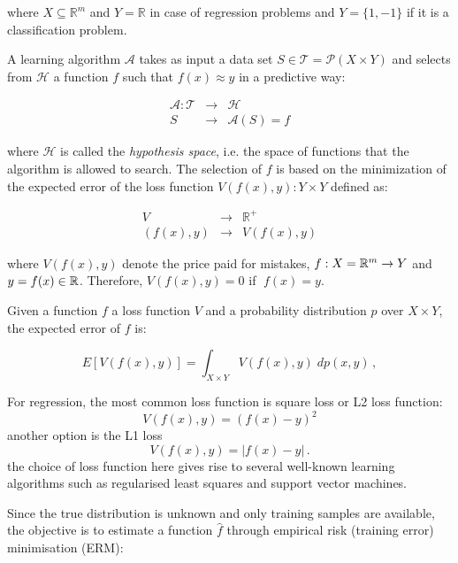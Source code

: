 \noindent where $X \subseteq \mathbb{R}^m$ and $Y = \mathbb{R}$ in case of
regression problems and $Y = \{1,-1\}$  if it is a classification problem. 


A learning algorithm $\mathcal{A}$ takes as input a data set $S \in
\mathscr{T}=\mathscr{P}(X\times Y)$ and selects from $\mathcal{H}$ a function
$f$ such that $f(x)\approx y $ in a predictive way:

\begin{eqnarray*}
\mathcal{A}: \mathscr{T} &\rightarrow & \mathcal{H} \\
S &\rightarrow &\mathcal{A}(S) = f
\end{eqnarray*}

\noindent where $\mathcal{H}$ is called the {\em hypothesis space}, i.e. the space
of functions that the algorithm is allowed to search. The selection of
$f$ is based on the minimization of the expected error of the loss
function $V(f(x),y): Y \times Y$ defined as:

\begin{eqnarray*}
 V & \rightarrow & \mathbb{R}^+ \\
  (f(x), y) &\rightarrow & V(f(x),y)
\end{eqnarray*}

\noindent where $V(f(x),y)$ denote the price paid for mistakes, $f:X={\mathbb R }^m\to Y$ and
$y=f(x)\in{\mathbb R }$. Therefore, $V(f(x),y)=0$ if $\;f(x)=y$.

Given a function $f$ a loss function $V$ and a probability distribution $p$ over $X \times Y$, the expected error of $f$ is:

\begin{equation}
\label{eq:expetedrisk}
E[V(f(x),y)] = \int_{X\times Y} V(f(x),y)\;dp(x,y)\,,
\end{equation}


For regression, the most common loss function is square loss or L2 loss function:
\begin{equation}
\label{eq:l2loss}
V(f(x),y) = (f(x)-y)^2
\end{equation}
\noindent another option is the L1 loss
\begin{equation}
\label{eq:l1loss}
V(f(x),y) = |f(x)-y| \, .
\end{equation}
\noindent the choice of loss function here gives rise to several well-known learning algorithms such as regularised least squares and support vector machines. %

Since the true distribution is unknown and only training samples are available, the objective is to estimate a function $\hat{f}$ through empirical risk (training error) minimisation (ERM): 

